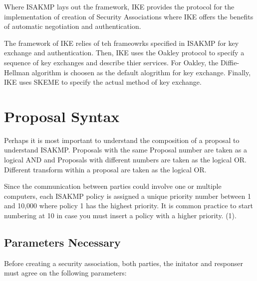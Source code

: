 \documentclass{report}
\begin{document}
\begin{itemize}
Where ISAKMP lays out the framework, IKE provides the protocol for the
implementation of creation of Security Associations where IKE offers the
benefits of automatic negotiation and authentication.

The framework of IKE relies of teh frameowrks specified in ISAKMP for key
exchange and authentication. Then, IKE uses the Oakley protocol to specify
a sequence of key exchanges and describe thier services. For Oakley, the
Diffie-Hellman algorithm is choosen as the default alogrithm for key exchange.
Finally, IKE uses SKEME to specify the actual method of key exchange. 

\chapter{Proposal Syntax}

Perhaps it is most important to understand the composition of a proposal to understand ISAKMP. Proposals with the same Proposal number are taken as a logical AND and Proposals with different numbers are taken as the logical OR. Different transform within a proposal are taken as the logical OR.

Since the communication between parties could involve one or multiple computers, each ISAKMP policy is assigned a unique priority number between 1 and 10,000 where policy 1 has the highest priority. It is common practice to start numbering at 10 in case you must insert a policy with a higher priority. (1).

\section {Parameters Necessary}

Before creating a security association, both parties, the initator and responser must agree on the following parameters:


\end{itemize}
\end{document}
